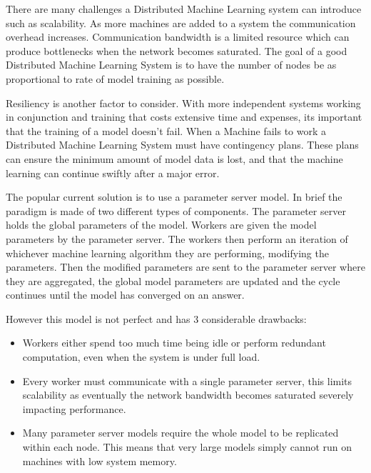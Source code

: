 There are many challenges a Distributed Machine Learning system can introduce
such as scalability. As more machines are added to a system the communication
overhead increases. Communication bandwidth is a limited resource which can
produce bottlenecks when the network becomes saturated. The goal of a good
Distributed Machine Learning System is to have the number of nodes be as
proportional to rate of model training as possible.
\par

Resiliency is another factor to consider. With more independent systems working
in conjunction and training that costs extensive time and expenses, its
important that the training of a model doesn't fail. When a Machine fails to
work a Distributed Machine Learning System must have contingency plans. These
plans can ensure the minimum amount of model data is lost, and that the machine
learning can continue swiftly after a major error.
\par


The popular current solution is to use a parameter server model. In brief the
paradigm is made of two different types of components. The parameter server
holds the global parameters of the model. Workers are given the model
parameters by the parameter server. The workers then perform an iteration of
whichever machine learning algorithm they are performing, modifying the
parameters. Then the modified parameters are sent to the parameter server
where they are aggregated, the global model parameters are updated and the
cycle continues until the model has converged on an answer.
\par

However this model is not perfect and has 3 considerable drawbacks:
\begin{itemize}
    \item Workers either spend too much time being idle or perform redundant
    computation, even when the system is under full load.
    \cite{googlemapreduce2008}
    \item Every worker must communicate with a single parameter server, this
    limits scalability as eventually the network bandwidth becomes saturated
    severely impacting performance. \cite{LI2014ParameterServers}
    \item Many parameter server models require the whole model to be replicated
    within each node. \cite{jia2018BeyondData} This means that very large models
    simply cannot run on machines with low system memory.  
\end{itemize}

